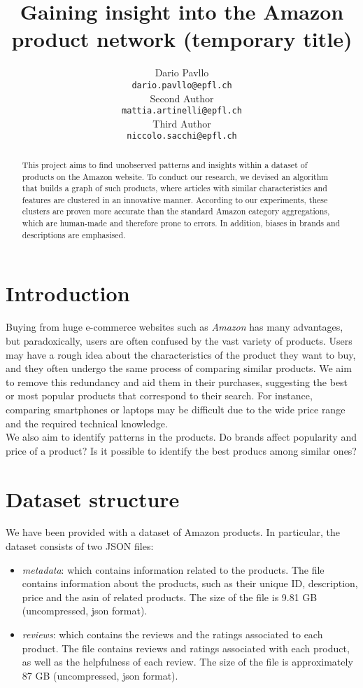 \documentclass[11pt]{article}
\title{Gaining insight into the Amazon product network (temporary title)}
\author{Dario Pavllo \\
  {\tt dario.pavllo@epfl.ch} \\\And
  Second Author \\
  {\tt mattia.artinelli@epfl.ch} \\\And
Third Author \\
{\tt niccolo.sacchi@epfl.ch} \\}
\date{}
\begin{document}
\maketitle
\begin{abstract}
This project aims to find unobserved patterns and insights within a dataset of products on the Amazon website. To conduct our research, we devised an algorithm that builds a graph of such products, where articles with similar characteristics and features are clustered in an innovative manner. According to our experiments, these clusters are proven more accurate than the standard Amazon category aggregations, which are human-made and therefore prone to errors. In addition, biases in brands and descriptions are emphasised.

\end{abstract}

\section{Introduction}
Buying from huge e-commerce websites such as \emph{Amazon} has many advantages, but paradoxically, users are often confused by the vast variety of products. Users may have a rough idea about the characteristics of the product they want to buy, and they often undergo the same process of comparing similar products. We aim to remove this redundancy and aid them in their purchases, suggesting the best or most popular products that correspond to their search. For instance, comparing smartphones or laptops may be difficult due to the wide price range and the required technical knowledge. \\ 
We also aim to identify patterns in the products. Do brands affect popularity and price of a product? Is it possible to identify the best producs among similar ones? 


\section{Dataset structure}
We have been provided with a dataset of Amazon products. In particular, the dataset consists of two JSON files: 
\begin{itemize}
	\item \textit{metadata}: which contains information related to the products. The file contains information about the products, such as their unique ID, description, price and the asin of related products. The size of the file is 9.81 GB (uncompressed, json format).
	\item \textit{reviews}: which contains the reviews and the ratings associated to each product. The file contains reviews and ratings associated with each product, as well as the helpfulness of each review. The size of the file is approximately 87 GB (uncompressed, json format).
\end{itemize}
\end{document}
